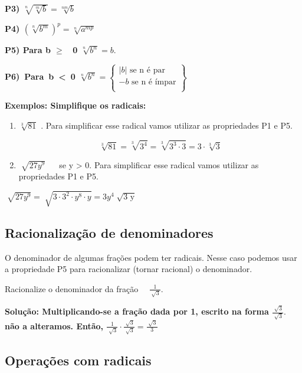 \textbf{P3)  \( \sqrt[n]{\sqrt[m]{b}}=\sqrt[nm]{b} \) }

\textbf{P4)  \(  \left( \sqrt[n]{b^{m}} \right) ^{p}=\sqrt[n]{a^{mp}} \) }

\textbf{P5) Para b $ \geq $ ~0    \( \sqrt[n]{b^{n}}=b . \) }

\textbf{P6)~Para~b~<~0       \( \sqrt[n]{b^{n}}= \left\{ \begin{matrix}
 \vert b \vert \textrm{ se n é par}\\
-b \textrm{ se n é ímpar} \\
\end{matrix} \right\}
 ~ \) }

\textbf{Exemplos: Simplifique os radicais:}

\begin{enumerate}
	\item  \( \sqrt[3]{81} \)  . Para simplificar esse radical vamos utilizar as propriedades P1 e P5.

 \[ \sqrt[3]{81}=\sqrt[3]{3^{4}}=\sqrt[3]{3^{3} \cdot 3}=3 \cdot \sqrt[3]{3} \] 

	\item  \( \sqrt[]{27y^{9}} \) ~~ se y > 0. Para simplificar esse radical vamos utilizar as propriedades P1 e P5.
\end{enumerate}

\quad  \( \sqrt[]{27y^{9}}=\sqrt[]{3  \cdot 3^{2} \cdot y^{8} \cdot y}=3y^{4}\sqrt[]{\text{3 y}} \) ~ \qedsymbol{}

\subsection{Racionalização de denominadores}

O denominador de algumas frações podem ter radicais. Nesse caso podemos usar a propriedade P5 para racionalizar (tornar racional) o denominador. 

\begin{texemplo}
	
Racionalize o denominador da fração~~   \( \frac{1}{\sqrt[]{3}}. \)

\textbf{Solução: Multiplicando-se a fração dada por 1, escrito na forma  \( \frac{\sqrt[]{3}}{\sqrt[]{3}}. \) ~~ não a alteramos. Então,  \( \frac{1}{\sqrt[]{3}} \cdot \frac{\sqrt[]{3}}{\sqrt[]{3}}=\frac{\sqrt[]{3}}{3} \) ~ \qedsymbol{}}
\end{texemplo}
\subsection{Operações com radicais}

